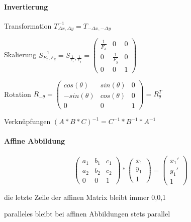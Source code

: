 \documentclass[landscape]{article}
\begin{document}
\begin{multicols}{3}
  \paragraph{Invertierung}
  \begin{description*}
    \item[Transformation]  $T_{\Delta x, \Delta y}^{-1} = T_{-\Delta x, -\Delta y}$
    \item[Skalierung] $S_{F_x, F_y}^{-1}=S_{\frac{1}{F_x},\frac{1}{F_y}}=\begin{pmatrix} \frac{1}{F_x} &0&0\\ 0&\frac{1}{F_y}&0\\ 0&0&1 \end{pmatrix}$
    \item[Rotation] $R_{-\theta} = \begin{pmatrix} cos(\theta) & sin(\theta) & 0 \\ -sin(\theta) & cos(\theta) & 0 \\ 0 & 0 & 1 \end{pmatrix} = R_{\theta}^{T}$
    \item[Verknüpfungen] $(A*B*C)^{-1}=C^{-1}*B^{-1}*A^{-1}$
  \end{description*}
  
  \paragraph{Affine Abbildung}
  $$\begin{pmatrix}a_1 & b_1 & c_1\\a_2 &b_2 & c_2\\ 0&0&1\end{pmatrix}*\begin{pmatrix} x_1\\y_1\\1\end{pmatrix}= \begin{pmatrix}x_1'\\y_1'\\1 \end{pmatrix}$$
  \begin{itemize*}
    \item die letzte Zeile der affinen Matrix bleibt immer 0,0,1
    \item paralleles bleibt bei affinen Abbildungen stets parallel
  \end{itemize*}
  

\end{multicols}
\end{document}
